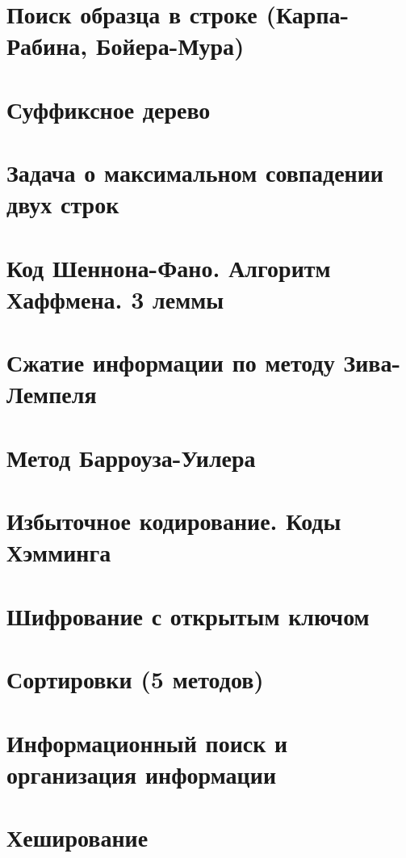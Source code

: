 \documentclass[12pt, fleqn]{article}
\begin{document}
\section{Поиск образца в строке (Карпа-Рабина, Бойера-Мура)}


\section{Суффиксное дерево}


\section{Задача о максимальном совпадении двух строк}


\section{Код Шеннона-Фано. Алгоритм Хаффмена. 3 леммы}


\section{Сжатие информации по методу Зива-Лемпеля}


\section{Метод Барроуза-Уилера}


\section{Избыточное кодирование. Коды Хэмминга}


\section{Шифрование с открытым ключом}


\section{Сортировки (5 методов)}


\section{Информационный поиск и организация информации}


\section{Хеширование}
\end{document}
